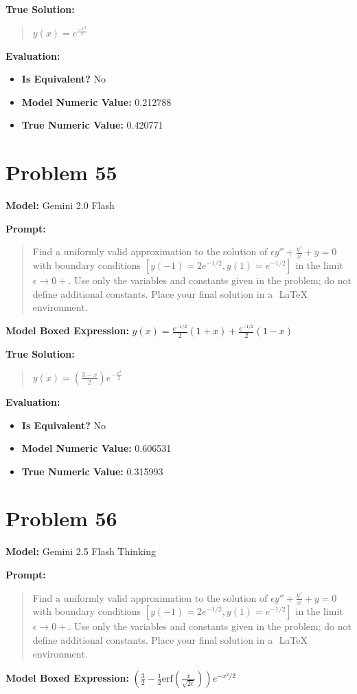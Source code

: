 \documentclass{article}
\begin{document}
\textbf{True Solution:}
\begin{quote}
$y(x)=e^{\frac{-x^3}{3}}$
\end{quote}

\textbf{Evaluation:}
\begin{itemize}
\item \textbf{Is Equivalent?} No
\item \textbf{Model Numeric Value:} 0.212788
\item \textbf{True Numeric Value:} 0.420771
\end{itemize}
\vspace{1cm}
\section*{Problem 55}
\textbf{Model:} Gemini 2.0 Flash

\textbf{Prompt:}
\begin{quote}
Find a uniformly valid approximation to the solution of $\epsilon y''+\frac{y'}{x}+y=0$ with boundary conditions $[y(-1)=2e^{-1/2}, y(1)=e^{-1/2}]$ in the limit $\epsilon \rightarrow 0+$. Use only the variables and constants given in the problem; do not define additional constants. Place your final solution in a $\boxed{}$ LaTeX environment.
\end{quote}
\textbf{Model Boxed Expression:} $y(x) = \frac{e^{-1/2}}{2} (1+x) + \frac{e^{-1/2}}{2} (1-x)$

\textbf{True Solution:}
\begin{quote}
$y(x)=\left(\frac{3-x}{2}\right)e^{-\frac{x^2}{2}}$
\end{quote}

\textbf{Evaluation:}
\begin{itemize}
\item \textbf{Is Equivalent?} No
\item \textbf{Model Numeric Value:} 0.606531
\item \textbf{True Numeric Value:} 0.315993
\end{itemize}
\vspace{1cm}
\section*{Problem 56}
\textbf{Model:} Gemini 2.5 Flash Thinking

\textbf{Prompt:}
\begin{quote}
Find a uniformly valid approximation to the solution of $\epsilon y''+\frac{y'}{x}+y=0$ with boundary conditions $[y(-1)=2e^{-1/2}, y(1)=e^{-1/2}]$ in the limit $\epsilon \rightarrow 0+$. Use only the variables and constants given in the problem; do not define additional constants. Place your final solution in a $\boxed{}$ LaTeX environment.
\end{quote}
\textbf{Model Boxed Expression:} $\left(\frac{3}{2} - \frac{1}{2}\text{erf}\left(\frac{x}{\sqrt{2\epsilon}}\right)\right)e^{-x^2/2}$
\end{document}
